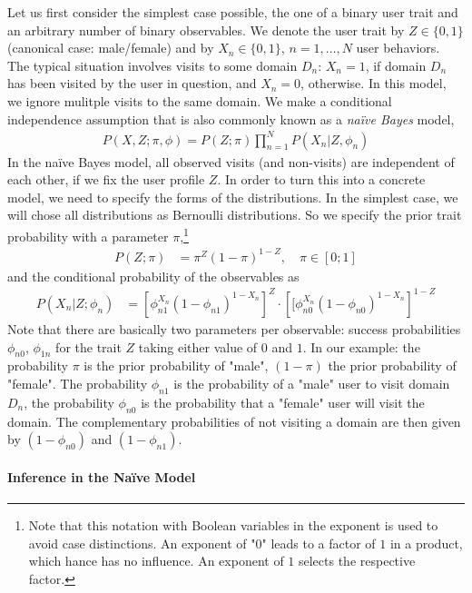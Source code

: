 \documentclass{article}
\begin{document}
Let us first consider the simplest case possible, the one of a binary user trait and an arbitrary number of binary observables.  We denote the user trait by $Z \in \{0,1\}$ (canonical case: male/female) and by $X_n \in \{0,1\}$, $n=1,\dots,N$ user behaviors. The typical situation involves visits to some domain $D_n$: $X_n=1$, if domain $D_n$ has been visited by the user in question, and $X_n=0$, otherwise. In this model, we ignore mulitple visits to the same domain. We make a conditional independence assumption that is also commonly known as a \textit{na\"ive Bayes} model,
\begin{align}
\label{eq:model0} 
P(X,Z; \pi, \phi) = P(Z; \pi) \prod_{n=1}^N P(X_n|Z, \phi_n) 
\end{align}  
In the na\"ive Bayes model, all observed visits (and non-visits) are independent of each other, if we fix the user profile $Z$. In order to turn this into a concrete model, we need to specify the forms of the distributions. In the simplest case, we will chose all distributions as Bernoulli distributions. So we specify the prior trait probability with a parameter $\pi$,\footnote{Note that this notation with Boolean variables in the exponent is used to avoid case distinctions. An exponent of "0" leads to a factor of $1$ in a product, which hance has no influence. An exponent of $1$ selects the respective factor.}
\begin{align}
P(Z; \pi) & = \pi^Z (1-\pi)^{1-Z}, \quad \pi \in [0;1]
\end{align}
and the conditional probability of the observables as 
\begin{align}
P(X_n |Z; \phi_n) &= \left[ \phi_{n1}^{X_n} (1-\phi_{n1})^{1-X_n} \right]^Z \cdot \left[ [ \phi_{n0}^{X_n} (1-\phi_{n0})^{1-X_n} \right]^{1-Z}
\end{align}
Note that there are basically two parameters per observable: success probabilities $\phi_{n0}$, $\phi_{1n}$  for the trait $Z$ taking either value of $0$ and $1$. In our example: the probability $\pi$ is the prior probability of "male", $(1-\pi)$ the prior probability of "female". The probability $\phi_{n1}$ is the probability of a "male" user to visit domain $D_n$, the probability $\phi_{n0}$ is the probability that a "female" user will visit the domain. The complementary probabilities of not visiting a domain are then given by $(1-\phi_{n0})$ and $(1-\phi_{n1})$. 

\paragraph{Inference in the Na\"ive Model}
\end{document}
